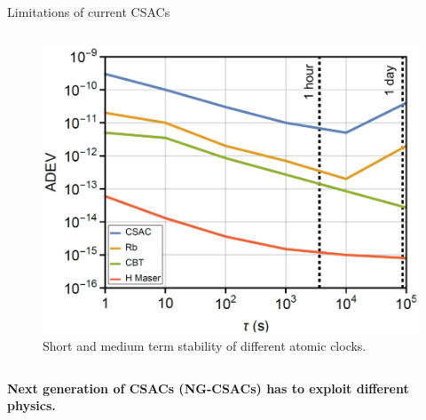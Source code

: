 \begin{frame}{Limitations of current CSACs}
\begin{columns}[c, onlytextwidth]
\begin{column}{0.48\textwidth}
            \begin{figure}
                \centering
                \includegraphics[height=0.4\textheight]{img/allan-without-quartz.png}
                \caption{Short and medium term stability of different atomic clocks.}
            \end{figure}

        \end{column}

    \end{columns}

    \textbf{Next generation of CSACs (NG-CSACs) has to exploit different physics.}


\end{frame}



